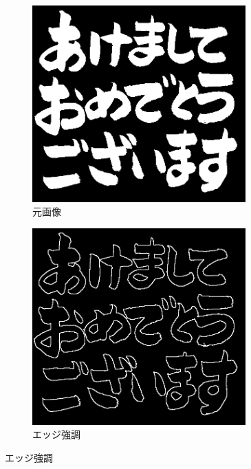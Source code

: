 \documentclass[a4paper,12pt]{jsarticle}
\begin{document}
\begin{figure}[!htbp]
\centering
\begin{subfigure}[b]{0.45\textwidth}
    \centering
    \includegraphics[width=0.9\textwidth]{./sampleimages/sample12.png}
    \caption{元画像}
\end{subfigure}
\hfill
\begin{subfigure}[b]{0.45\textwidth}
    \centering
    \includegraphics[width=0.9\textwidth]{./images/edge_enhanced_sample12_edge.png}
    \caption{エッジ強調}
\end{subfigure}


\end{figure}
\end{document}
